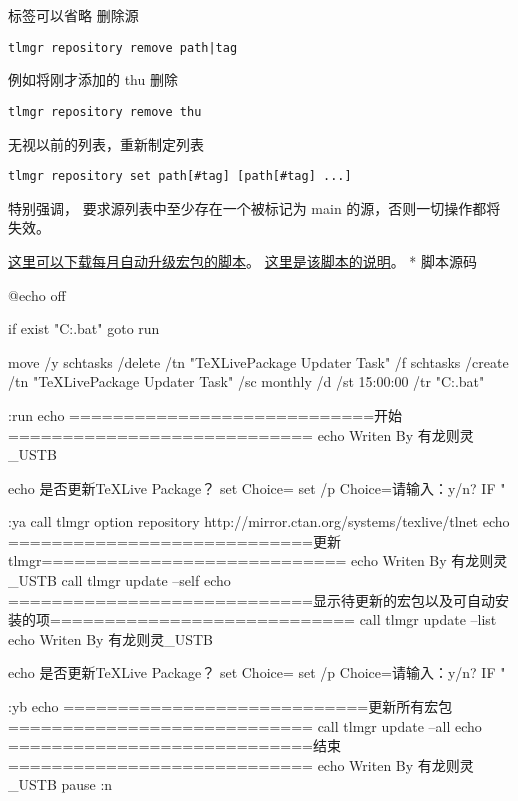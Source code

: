 标签可以省略 删除源
\begin{verbatim}
tlmgr repository remove path|tag
\end{verbatim}

例如将刚才添加的 thu 删除
\begin{verbatim}
tlmgr repository remove thu
\end{verbatim}

无视以前的列表，重新制定列表
\begin{verbatim}
tlmgr repository set path[#tag] [path[#tag] ...]
\end{verbatim}

特别强调，\TeXLive{} 要求源列表中至少存在一个被标记为 main
的源，否则一切操作都将失效。



\href{http://pd10ibe5c.bkt.clouddn.com/TeXLive\%E5\%AE\%8F\%E5\%8C\%85\%E6\%AF\%8F\%E6\%9C\%88\%E8\%87\%AA\%E5\%8A\%A8\%E6\%9B\%B4\%E6\%96\%B0.zip}{这里可以下载每月自动升级\TeXLive{}宏包的脚本}。
\href{http://htharoldht.com/texlive-package-automatically-upgrades-every-month/}{这里是该脚本的说明}。
* 脚本源码

\begin{batcode}
  @echo off

  if exist "C:\Windows\Tasks\AutoTeXLivePackageUpdaterMonthly.bat" goto run

  move /y %
  schtasks /delete /tn "TeXLivePackage Updater Task" /f
  schtasks /create /tn "TeXLivePackage Updater Task" /sc monthly /d /st 15:00:00 /tr "C:\Windows\Tasks\AutoTeXLivePackageUpdaterMonthly.bat"

  :run
  echo ============================开始============================
  echo Writen By 有龙则灵_USTB

  echo 是否更新TeXLive Package？
  set Choice=
  set /p Choice=请输入：y/n?
  IF "%

  :ya
  call tlmgr option repository http://mirror.ctan.org/systems/texlive/tlnet
  echo ============================更新tlmgr============================
  echo Writen By 有龙则灵_USTB
  call tlmgr update --self
  echo ============================显示待更新的宏包以及可自动安装的项============================
  call tlmgr update --list
  echo Writen By 有龙则灵_USTB

  echo 是否更新TeXLive Package？
  set Choice=
  set /p Choice=请输入：y/n?
  IF "%

  :yb
  echo ============================更新所有宏包============================
  call tlmgr update --all
  echo ============================结束============================
  echo Writen By 有龙则灵_USTB
  pause
  :n
\end{batcode}

